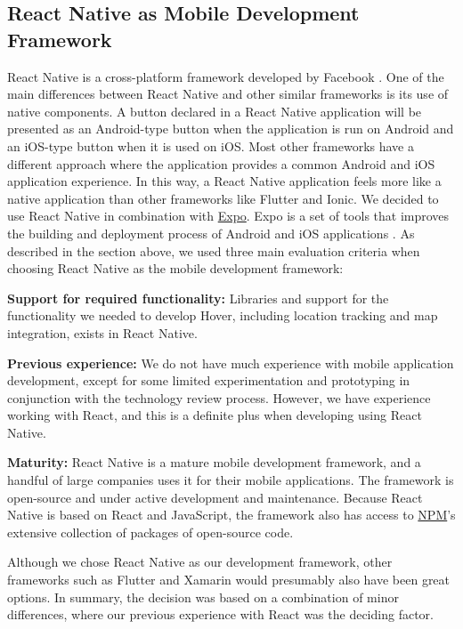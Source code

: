 \subsection{React Native as Mobile Development Framework}
React Native is a cross-platform framework developed by Facebook \citep{occhino_react_2015}. One of the main differences between React Native and other similar frameworks is its use of native components. A button declared in a React Native application will be presented as an Android-type button when the application is run on Android and an iOS-type button when it is used on iOS. Most other frameworks have a different approach where the application provides a common Android and iOS application experience. In this way, a React Native application feels more like a native application than other frameworks like Flutter and Ionic. 
We decided to use React Native in combination with \href{https://expo.io}{Expo}. Expo is a set of tools that improves the building and deployment process of Android and iOS applications \citep{vatne_introduction_2021}. As described in the section above, we used three main evaluation criteria when choosing React Native as the mobile development framework:

\textbf{Support for required functionality:} Libraries and support for the functionality we needed to develop Hover, including location tracking and map integration, exists in React Native.

\textbf{Previous experience:} We do not have much experience with mobile application development, except for some limited experimentation and prototyping in conjunction with the technology review process. However, we have experience working with React, and this is a definite plus when developing using React Native.

\textbf{Maturity:} React Native is a mature mobile development framework, and a handful of large companies uses it for their mobile applications. The framework is open-source and under active development and maintenance. Because React Native is based on React and JavaScript, the framework also has access to \href{https://www.npmjs.com}{NPM}’s extensive collection of packages of open-source code.

Although we chose React Native as our development framework, other frameworks such as Flutter and Xamarin would presumably also have been great options. In summary, the decision was based on a combination of minor differences, where our previous experience with React was the deciding factor.

